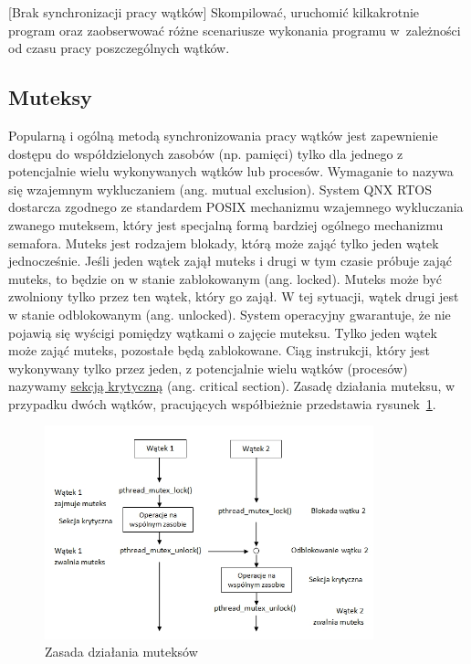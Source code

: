 \begin{example}{[Brak synchronizacji pracy wątków]} \label{ex:nosynchro}
Skompilować, uruchomić kilkakrotnie program oraz zaobserwować różne scenariusze wykonania programu w~zależności od czasu pracy poszczególnych wątków.  


\end{example}

\subsection{Muteksy}

Popularną i ogólną metodą synchronizowania pracy wątków jest zapewnienie dostępu do współdzielonych zasobów (np. pamięci) tylko dla jednego z potencjalnie wielu wykonywanych wątków lub procesów. Wymaganie to nazywa się wzajemnym wykluczaniem (ang. mutual exclusion). System QNX RTOS dostarcza zgodnego ze standardem POSIX mechanizmu wzajemnego wykluczania zwanego muteksem, który jest specjalną formą bardziej ogólnego mechanizmu semafora. Muteks jest rodzajem blokady, którą może zająć tylko jeden wątek jednocześnie. Jeśli jeden wątek zajął muteks i drugi w tym czasie próbuje zająć muteks, to będzie on w stanie zablokowanym (ang. locked). Muteks może być zwolniony tylko przez ten wątek, który go zajął. W tej sytuacji, wątek drugi jest w stanie odblokowanym (ang. unlocked). System operacyjny gwarantuje, że nie pojawią się wyścigi pomiędzy wątkami o zajęcie muteksu. Tylko jeden wątek może zająć muteks, pozostałe będą zablokowane. Ciąg instrukcji, który jest wykonywany tylko przez jeden, z potencjalnie wielu wątków (procesów) nazywamy \underline{sekcją krytyczną} (ang. critical section). Zasadę działania muteksu, w przypadku dwóch wątków, pracujących współbieżnie przedstawia rysunek~\ref{fig:mutex}. 

\begin{figure}[!h]
\centering
\includegraphics[width=0.85\textwidth]{img/mutex}
\caption{Zasada działania muteksów}
\label{fig:mutex}
\end{figure}

